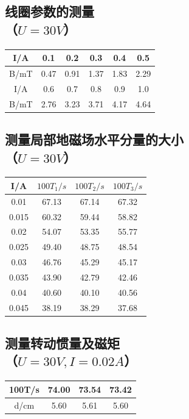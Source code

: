 \documentclass[a4paper]{ltxdoc}
\begin{document}
\begin{multicols}{2}
    \subsection{线圈参数的测量\\（$U=30V$）}

    \begin{tabular}{|c|c|c|c|c|c|}
        \hline
        I/A  & 0.1  & 0.2  & 0.3  & 0.4  & 0.5  \\\hline
        B/mT & 0.47 & 0.91 & 1.37 & 1.83 & 2.29 \\\hline
        I/A  & 0.6  & 0.7  & 0.8  & 0.9  & 1.0  \\\hline
        B/mT & 2.76 & 3.23 & 3.71 & 4.17 & 4.64 \\\hline
    \end{tabular}

    \subsection{测量局部地磁场水平分量的大小\\（$U=30V$）}

    \begin{tabular}{|c|c|c|c|}
        \hline
        I/A   & $100T_1/s$ & $100T_2/s$ & $100T_3/s$ \\\hline
        0.01  & 67.13      & 67.14      & 67.32      \\\hline
        0.015 & 60.32      & 59.44      & 58.82      \\\hline
        0.02  & 54.07      & 53.35      & 55.77      \\\hline
        0.025 & 49.40      & 48.75      & 48.54      \\\hline
        0.03  & 46.76      & 45.29      & 45.17      \\\hline
        0.035 & 43.90      & 42.79      & 42.46      \\\hline
        0.04  & 40.60      & 40.10      & 40.56      \\\hline
        0.045 & 38.19      & 38.29      & 37.68      \\\hline
    \end{tabular}

    \subsection{测量转动惯量及磁矩\\（$U=30V, I = 0.02A$）}

    \begin{tabular}{|c|c|c|c|}
        \hline
        100T/s & 74.00 & 73.54 & 73.42 \\\hline
        d/cm   & 5.60  & 5.61  & 5.60  \\\hline
    \end{tabular}


\end{multicols}
\end{document}
